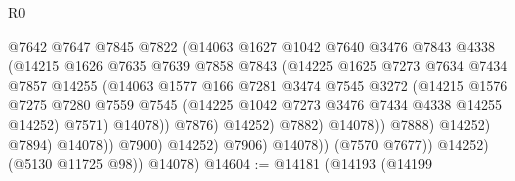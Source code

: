 \begin{lexlean}{R0}
\begin{coremodule}
                                      @7642
                                      @7647
                                      @7845
                                      @7822
                                      (@14063
                                        @1627
                                        @1042
                                        @7640
                                        @3476
                                        @7843
                                        @4338
                                        (@14215
                                          @1626
                                          @7635
                                          @7639
                                          @7858
                                          @7843
                                          (@14225
                                            @1625
                                            @7273
                                            @7634
                                            @7434
                                            @7857
                                            @14255
                                            (@14063
                                              @1577
                                              @166
                                              @7281
                                              @3474
                                              @7545
                                              @3272
                                              (@14215
                                                @1576
                                                @7275
                                                @7280
                                                @7559
                                                @7545
                                                (@14225 @1042 @7273 @3476 @7434 @4338 @14255 @14252)
                                                @7571)
                                              @14078))
                                          @7876)
                                        @14252)
                                      @7882)
                                    @14078))
                                @7888)
                              @14252)
                            @7894)
                          @14078))
                      @7900)
                    @14252)
                  @7906)
                @14078))
            (@7570 @7677))
          @14252)
        (@5130 @11725 @98))
      @14078)
@14604 := @14181
    (@14193
      (@14199

\end{coremodule}
\end{lexlean}
